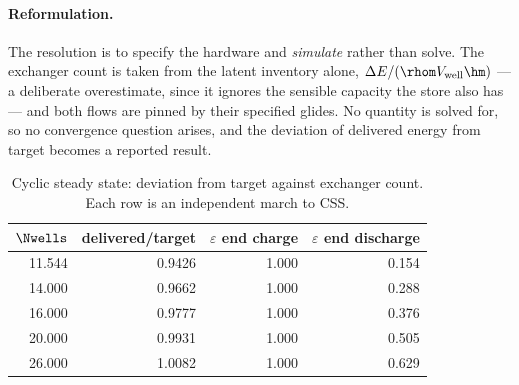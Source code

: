 \paragraph{Reformulation.}
The resolution is to specify the hardware and \emph{simulate} rather than solve.
The exchanger count is taken from the latent inventory alone,
$\Delta E/(\rhom V_{\mathrm{well}}\hm)$ --- a deliberate overestimate, since it
ignores the sensible capacity the store also has --- and both flows are pinned
by their specified glides. No quantity is solved for, so no convergence question
arises, and the deviation of delivered energy from target becomes a reported
result.

\begin{table}[htbp]
\centering
\caption{Cyclic steady state: deviation from target against exchanger count.
Each row is an independent march to CSS.}
\label{tab:css}
\begin{tabular}{@{}r r r r@{}}
\toprule
$\Nwells$ & delivered/target & $\varepsilon$ end charge & $\varepsilon$ end discharge \\
\midrule
11.544 & 0.9426 & 1.000 & 0.154 \\
14.000 & 0.9662 & 1.000 & 0.288 \\
16.000 & 0.9777 & 1.000 & 0.376 \\
20.000 & 0.9931 & 1.000 & 0.505 \\
26.000 & 1.0082 & 1.000 & 0.629 \\
\bottomrule
\end{tabular}
\end{table}

